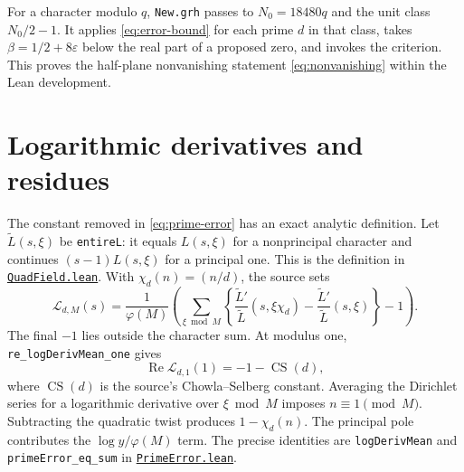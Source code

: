 \documentclass[11pt,oneside,openany]{amsbook}
\theoremstyle{remark}
\numberwithin{equation}{section}
\newcommand{\eps}{\varepsilon}
\newcommand{\re}{\operatorname{Re}}
\newcommand{\ghroot}{https://github.com/lsernau/grh-lean/blob/}
\newcommand{\ghrev}{72fead102f663d5c7a407964a13dc0cf9d977207}
\newcommand{\leanfile}[2]{%
  \href{\ghroot\ghrev/grh-compact/src/#1}{\nolinkurl{#2}}}
\begin{document}
For a character modulo $q$, \texttt{New.grh} passes to
$N_0=18480q$ and the unit class $N_0/2-1$. It applies
\eqref{eq:error-bound} for each prime $d$ in that class, takes
$\beta=1/2+8\eps$ below the real part of a proposed zero,
and invokes the criterion. This proves the half-plane
nonvanishing statement \eqref{eq:nonvanishing} within the Lean
development.

\section{Logarithmic derivatives and residues}
\label{sec:log-derivative}
The constant removed in \eqref{eq:prime-error} has an exact
analytic definition. Let $\widetilde L(s,\xi)$ be
\texttt{entireL}: it equals $L(s,\xi)$ for a nonprincipal
character and continues $(s-1)L(s,\xi)$ for a principal
one. This is the definition in
\leanfile{Lib/General/NumberTheory/QuadField.lean}%
{QuadField.lean}. With $\chi_d(n)=(n/d)$, the source sets
\begin{equation}
\label{eq:log-derivative-mean}
\mathcal L_{d,M}(s)=\frac1{\varphi(M)}
\left(\sum_{\xi\bmod M}
\left\{\frac{\widetilde L'}{\widetilde L}
  (s,\xi\chi_d)-
  \frac{\widetilde L'}{\widetilde L}(s,\xi)\right\}-1\right).
\end{equation}
The final $-1$ lies outside the character sum. At modulus
one, \texttt{re\_logDerivMean\_one} gives
\begin{equation}
\label{eq:mean-at-one}
\re\mathcal L_{d,1}(1)
  =-1-\operatorname{CS}(d),
\end{equation}
where $\operatorname{CS}(d)$ is the source's
Chowla--Selberg constant. Averaging the Dirichlet series
for a logarithmic derivative over $\xi\bmod M$ imposes
$n\equiv1\pmod M$. Subtracting the quadratic twist
produces $1-\chi_d(n)$. The principal pole contributes the
$\log y/\varphi(M)$ term. The precise identities are
\texttt{logDerivMean} and \texttt{primeError\_eq\_sum}
in \leanfile{New/Endgame/PrimeError.lean}{PrimeError.lean}.
\end{document}
